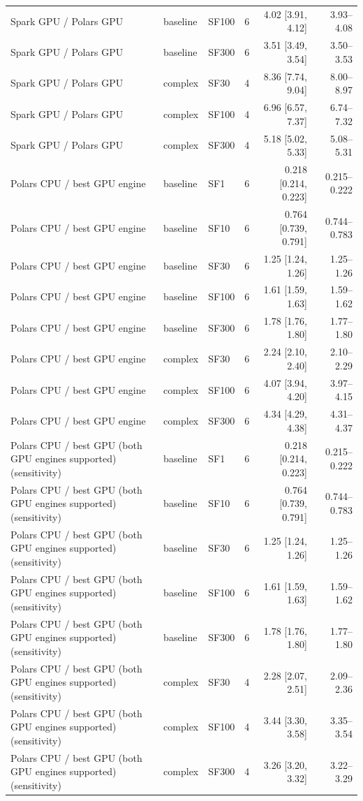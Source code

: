 \begin{tabular}{lllrrr}
Spark GPU / Polars GPU & baseline & SF100 & 6 & 4.02 [3.91, 4.12] & 3.93--4.08 \\
Spark GPU / Polars GPU & baseline & SF300 & 6 & 3.51 [3.49, 3.54] & 3.50--3.53 \\
Spark GPU / Polars GPU & complex & SF30 & 4 & 8.36 [7.74, 9.04] & 8.00--8.97 \\
Spark GPU / Polars GPU & complex & SF100 & 4 & 6.96 [6.57, 7.37] & 6.74--7.32 \\
Spark GPU / Polars GPU & complex & SF300 & 4 & 5.18 [5.02, 5.33] & 5.08--5.31 \\
Polars CPU / best GPU engine & baseline & SF1 & 6 & 0.218 [0.214, 0.223] & 0.215--0.222 \\
Polars CPU / best GPU engine & baseline & SF10 & 6 & 0.764 [0.739, 0.791] & 0.744--0.783 \\
Polars CPU / best GPU engine & baseline & SF30 & 6 & 1.25 [1.24, 1.26] & 1.25--1.26 \\
Polars CPU / best GPU engine & baseline & SF100 & 6 & 1.61 [1.59, 1.63] & 1.59--1.62 \\
Polars CPU / best GPU engine & baseline & SF300 & 6 & 1.78 [1.76, 1.80] & 1.77--1.80 \\
Polars CPU / best GPU engine & complex & SF30 & 6 & 2.24 [2.10, 2.40] & 2.10--2.29 \\
Polars CPU / best GPU engine & complex & SF100 & 6 & 4.07 [3.94, 4.20] & 3.97--4.15 \\
Polars CPU / best GPU engine & complex & SF300 & 6 & 4.34 [4.29, 4.38] & 4.31--4.37 \\
Polars CPU / best GPU (both GPU engines supported) (sensitivity) & baseline & SF1 & 6 & 0.218 [0.214, 0.223] & 0.215--0.222 \\
Polars CPU / best GPU (both GPU engines supported) (sensitivity) & baseline & SF10 & 6 & 0.764 [0.739, 0.791] & 0.744--0.783 \\
Polars CPU / best GPU (both GPU engines supported) (sensitivity) & baseline & SF30 & 6 & 1.25 [1.24, 1.26] & 1.25--1.26 \\
Polars CPU / best GPU (both GPU engines supported) (sensitivity) & baseline & SF100 & 6 & 1.61 [1.59, 1.63] & 1.59--1.62 \\
Polars CPU / best GPU (both GPU engines supported) (sensitivity) & baseline & SF300 & 6 & 1.78 [1.76, 1.80] & 1.77--1.80 \\
Polars CPU / best GPU (both GPU engines supported) (sensitivity) & complex & SF30 & 4 & 2.28 [2.07, 2.51] & 2.09--2.36 \\
Polars CPU / best GPU (both GPU engines supported) (sensitivity) & complex & SF100 & 4 & 3.44 [3.30, 3.58] & 3.35--3.54 \\
Polars CPU / best GPU (both GPU engines supported) (sensitivity) & complex & SF300 & 4 & 3.26 [3.20, 3.32] & 3.22--3.29 \\
\bottomrule
\end{tabular}

